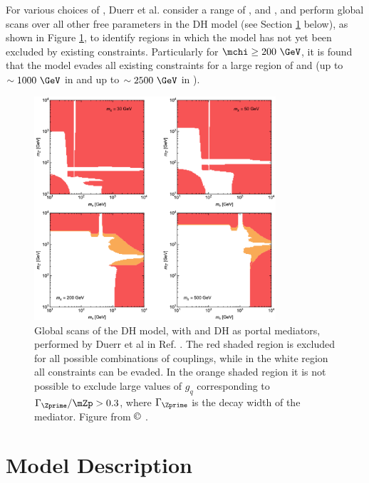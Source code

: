For various choices of \mchi, Duerr et al. \cite{Duerr_2016} consider a range of \ms, \mZp and \mchi, and perform global scans over all other free parameters in the DH model (see Section \ref{sec:DH_model_description} below), as shown in Figure \ref{fig:Duerr_general_constraints}, to identify regions in which the model has not yet been excluded by existing constraints. Particularly for \(\mchi\geq200 ~\GeV\), it is found that the model evades all existing constraints for a large region of \ms and \mZp (up to \(\sim1000~\GeV\) in \ms and up to \(\sim2500~\GeV\) in \mZp).

\begin{figure}[hp]
	\centering
	\includegraphics[width=0.8\textwidth]{Figures/2/Duerr_general_constraints.pdf}
	\caption{Global scans of the DH model, with \Zprime and DH as portal mediators, performed by Duerr et al in Ref. \cite{Duerr_2016}. The red shaded region is excluded for all possible
combinations of couplings, while in the white region all constraints can be evaded. In the orange shaded region it is not possible to exclude large values of \(g_q\) corresponding to \(\Gamma_\Zprime / \mZp > 0.3\), where \(\Gamma_\Zprime\) is the decay width of the \Zprime mediator. Figure from $\copyright$ \cite{Duerr_2016}.}
	\label{fig:Duerr_general_constraints}
\end{figure}

\section{Model Description}
\label{sec:DH_model_description}


